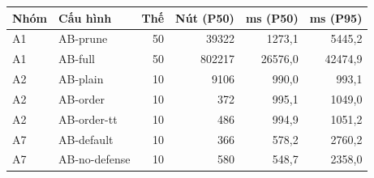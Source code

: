 \begin{center}\small
\begin{tabular}{@{}llrrrr@{}}
\toprule
Nhóm & Cấu hình & Thế & Nút (P50) & ms (P50) & ms (P95) \\
\midrule
A1 & AB-prune & 50 & 39322 & 1273,1 & 5445,2 \\
A1 & AB-full & 50 & 802217 & 26576,0 & 42474,9 \\
A2 & AB-plain & 10 & 9106 & 990,0 & 993,1 \\
A2 & AB-order & 10 & 372 & 995,1 & 1049,0 \\
A2 & AB-order-tt & 10 & 486 & 994,9 & 1051,2 \\
A7 & AB-default & 10 & 366 & 578,2 & 2760,2 \\
A7 & AB-no-defense & 10 & 580 & 548,7 & 2358,0 \\
\bottomrule
\end{tabular}
\end{center}